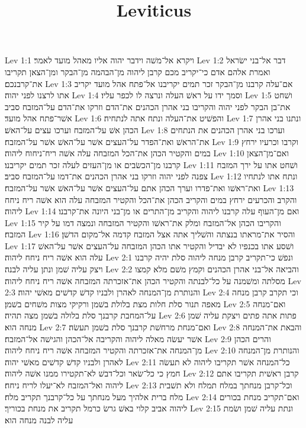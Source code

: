 

\title{Leviticus}

Lev 1:1  ויקרא אל־משׁה וידבר יהוה אליו מאהל מועד לאמר׃
Lev 1:2  דבר אל־בני ישׂראל ואמרת אלהם אדם כי־יקריב מכם קרבן ליהוה מן־הבהמה מן־הבקר ומן־הצאן תקריבו את־קרבנכם׃
Lev 1:3  אם־עלה קרבנו מן־הבקר זכר תמים יקריבנו אל־פתח אהל מועד יקריב אתו לרצנו לפני יהוה׃
Lev 1:4  וסמך ידו על ראשׁ העלה ונרצה לו לכפר עליו׃
Lev 1:5  ושׁחט את־בן הבקר לפני יהוה והקריבו בני אהרן הכהנים את־הדם וזרקו את־הדם על־המזבח סביב אשׁר־פתח אהל מועד׃
Lev 1:6  והפשׁיט את־העלה ונתח אתה לנתחיה׃
Lev 1:7  ונתנו בני אהרן הכהן אשׁ על־המזבח וערכו עצים על־האשׁ׃
Lev 1:8  וערכו בני אהרן הכהנים את הנתחים את־הראשׁ ואת־הפדר על־העצים אשׁר על־האשׁ אשׁר על־המזבח׃
Lev 1:9  וקרבו וכרעיו ירחץ במים והקטיר הכהן את־הכל המזבחה עלה אשׁה ריח־ניחוח ליהוה׃
Lev 1:10  ואם־מן־הצאן קרבנו מן־הכשׂבים או מן־העזים לעלה זכר תמים יקריבנו׃
Lev 1:11  ושׁחט אתו על ירך המזבח צפנה לפני יהוה וזרקו בני אהרן הכהנים את־דמו על־המזבח סביב׃
Lev 1:12  ונתח אתו לנתחיו ואת־ראשׁו ואת־פדרו וערך הכהן אתם על־העצים אשׁר על־האשׁ אשׁר על־המזבח׃
Lev 1:13  והקרב והכרעים ירחץ במים והקריב הכהן את־הכל והקטיר המזבחה עלה הוא אשׁה ריח ניחח ליהוה׃
Lev 1:14  ואם מן־העוף עלה קרבנו ליהוה והקריב מן־התרים או מן־בני היונה את־קרבנו׃
Lev 1:15  והקריבו הכהן אל־המזבח ומלק את־ראשׁו והקטיר המזבחה ונמצה דמו על קיר המזבח׃
Lev 1:16  והסיר את־מראתו בנצתה והשׁליך אתה אצל המזבח קדמה אל־מקום הדשׁן׃
Lev 1:17  ושׁסע אתו בכנפיו לא יבדיל והקטיר אתו הכהן המזבחה על־העצים אשׁר על־האשׁ עלה הוא אשׁה ריח ניחח ליהוה׃
Lev 2:1  ונפשׁ כי־תקריב קרבן מנחה ליהוה סלת יהיה קרבנו ויצק עליה שׁמן ונתן עליה לבנה׃
Lev 2:2  והביאה אל־בני אהרן הכהנים וקמץ משׁם מלא קמצו מסלתה ומשׁמנה על כל־לבנתה והקטיר הכהן את־אזכרתה המזבחה אשׁה ריח ניחח ליהוה׃
Lev 2:3  והנותרת מן־המנחה לאהרן ולבניו קדשׁ קדשׁים מאשׁי יהוה׃
Lev 2:4  וכי תקרב קרבן מנחה מאפה תנור סלת חלות מצת בלולת בשׁמן ורקיקי מצות משׁחים בשׁמן׃
Lev 2:5  ואם־מנחה על־המחבת קרבנך סלת בלולה בשׁמן מצה תהיה׃
Lev 2:6  פתות אתה פתים ויצקת עליה שׁמן מנחה הוא׃
Lev 2:7  ואם־מנחת מרחשׁת קרבנך סלת בשׁמן תעשׂה׃
Lev 2:8  והבאת את־המנחה אשׁר יעשׂה מאלה ליהוה והקריבה אל־הכהן והגישׁה אל־המזבח׃
Lev 2:9  והרים הכהן מן־המנחה את־אזכרתה והקטיר המזבחה אשׁה ריח ניחח ליהוה׃
Lev 2:10  והנותרת מן־המנחה לאהרן ולבניו קדשׁ קדשׁים מאשׁי יהוה׃
Lev 2:11  כל־המנחה אשׁר תקריבו ליהוה לא תעשׂה חמץ כי כל־שׂאר וכל־דבשׁ לא־תקטירו ממנו אשׁה ליהוה׃
Lev 2:12  קרבן ראשׁית תקריבו אתם ליהוה ואל־המזבח לא־יעלו לריח ניחח׃
Lev 2:13  וכל־קרבן מנחתך במלח תמלח ולא תשׁבית מלח ברית אלהיך מעל מנחתך על כל־קרבנך תקריב מלח׃
Lev 2:14  ואם־תקריב מנחת בכורים ליהוה אביב קלוי באשׁ גרשׂ כרמל תקריב את מנחת בכוריך׃
Lev 2:15  ונתת עליה שׁמן ושׂמת עליה לבנה מנחה הוא׃
